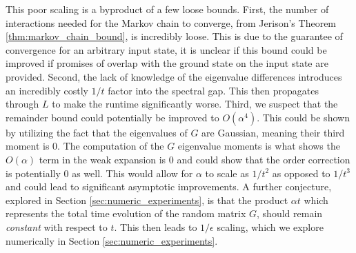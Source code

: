 \documentclass{article}
\newcommand{\bigo}[1]{O\left(#1\right)}
\begin{document}
This poor scaling is a byproduct of a few loose bounds. First, the number of interactions needed for the Markov chain to converge, from Jerison's Theorem \ref{thm:markov_chain_bound}, is incredibly loose. This is due to the guarantee of convergence for an arbitrary input state, it is unclear if this bound could be improved if promises of overlap with the ground state on the input state are provided. Second, the lack of knowledge of the eigenvalue differences introduces an incredibly costly $1 / t$ factor into the spectral gap. This then propagates through $L$ to make the runtime significantly worse. Third, we suspect that the remainder bound could potentially be improved to $\bigo{\alpha^4}$. This could be shown by utilizing the fact that the eigenvalues of $G$ are Gaussian, meaning their third moment is 0. The computation of the $G$ eigenvalue moments is what shows the $\bigo{\alpha}$ term in the weak expansion is 0 and could show that the order correction is potentially 0 as well. This would allow for $\alpha$ to scale as $1 / t^2$ as opposed to $1 / t^3$ and could lead to significant asymptotic improvements. A further conjecture, explored in Section \ref{sec:numeric_experiments}, is that the product $\alpha t$ which represents the total time evolution of the random matrix $G$, should remain \emph{constant} with respect to $t$. This then leads to $1/\epsilon$ scaling, which we explore numerically in Section \ref{sec:numeric_experiments}.
\end{document}
